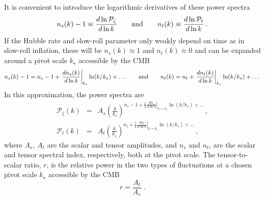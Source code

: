 It is convenient to introduce the logarithmic derivatives of these power spectra 
\begin{equation}\label{eq:specind}
n_s(k)-1\equiv\frac{d\ln \mathcal{P}_{\zeta}}{d\ln k}\qquad{\rm and}\qquad n_t(k)\equiv \frac{d\ln \mathcal{P}_t}{d\ln k}\,.
\end{equation}
If the Hubble rate and slow-roll parameter only weakly depend on time as in slow-roll inflation, these will be $n_s(k)\approx 1$ and $n_t(k)\approx 0$ and can be expanded around a pivot scale $k_\star$ accessible by the CMB
\begin{equation}
n_s(k)-1=n_s-1+\left.\frac{dn_s(k)}{d\ln k}\right|_{k_\star}\ln(k/k_\star)+\dots\qquad{\rm and}\qquad n_t(k)=n_t+\left.\frac{dn_t(k)}{d\ln k}\right|_{k_\star}\ln(k/k_\star)+\dots
\end{equation}
In this approximation, the power spectra are
\begin{eqnarray}\label{eq:power_spectra_power_law}
\mathcal{P}_{\zeta}(k)&=& A_s\left(\frac{k}{k_\star}\right)^{n_s-1+\frac{1}{2}\left.\frac{dn_s}{d\ln k}\right|_{k=k_\star}\ln(k/k_\star)+\dots}\,,\nonumber\\
\mathcal{P}_{t}(k)&=& A_t \left(\frac{k}{k_\star}\right)^{n_t+\frac{1}{2}\left.\frac{dn_t}{d\ln k}\right|_{k=k_\star}\ln(k/k_\star)+\dots}\,,
\end{eqnarray}
where $A_s$, $A_t$ are the scalar and tensor amplitudes, and $n_s$ and $n_t$, are the scalar and tensor spectral index, respectively, both at the pivot scale. 
The tensor-to-scalar ratio, $r$, is the relative power in the two types of fluctuations at a chosen pivot scale $k_\star$ accessible by the CMB
\begin{equation}
r=\frac{A_t}{A_s}\;.
\end{equation}

